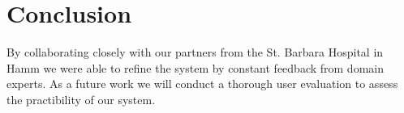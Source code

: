 \documentclass{egpubl}
\begin{document}
\section{Conclusion}
By collaborating closely with our partners from the St. Barbara Hospital in Hamm we were able to refine the system by constant feedback from domain experts. As a future work we will conduct a thorough user evaluation to assess the practibility of our system.

%


\end{document}
